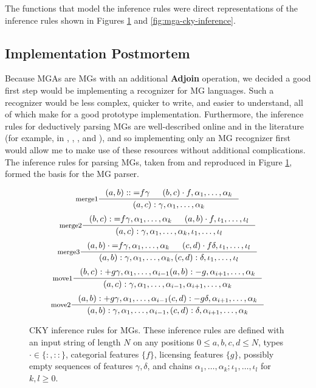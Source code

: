 \documentclass{article}
\begin{document}
The functions that model the inference rules were direct
representations of the inference rules shown in Figures
\ref{fig:mg-cky-inference} and \ref{fig:mga-cky-inference}.


\subsection{Implementation Postmortem}
\label{sec:implementation-postmortem}

Because MGAs are MGs with an additional \textbf{Adjoin} operation, we
decided a good first step would be implementing a recognizer for MG
languages.  Such a recognizer would be less complex, quicker to write,
and easier to understand, all of which make for a good prototype
implementation.  Furthermore, the inference rules for deductively
parsing MGs are well-described online and in the literature (for
example, in \cite{stabler2001}, \cite{harkema2001}, \cite{dost2011},
and \cite{sportiche2013}), and so implementing only an MG recognizer
first would allow me to make use of these resources without additional
complications.  The inference rules for parsing MGs, taken from
\cite{stabler2001} and reproduced in Figure
\ref{fig:mg-cky-inference}, formed the basis for the MG parser.

\begin{figure}[h]
  \centering
  \[
    \inference[merge1]{
      (a, b) :: \text{=}f \gamma &
      (b, c) \cdot f, \alpha_1, \dots, \alpha_k
    }{
      (a, c) : \gamma, \alpha_1, \dots, \alpha_k
    }
  \]
  \[
    \inference[merge2]{
      (b, c) : \text{=}f \gamma, \alpha_1, \dots, \alpha_k &
      (a, b) \cdot f, \iota_1, \dots, \iota_l
    }{
      (a, c) : \gamma, \alpha_1, \dots, \alpha_k, \iota_1, \dots, \iota_l
    }
  \]
  \[
    \inference[merge3]{
      (a, b) \cdot \text{=}f \gamma, \alpha_1, \dots, \alpha_k &
      (c, d) \cdot f \delta, \iota_1, \dots, \iota_l
    }{
      (a, b) : \gamma, \alpha_1, \dots, \alpha_k, (c, d) : \delta, \iota_1, \dots, \iota_l
    }
  \]
  \[
    \inference[move1]{
      (b, c) : +g \gamma, \alpha_1, \dots, \alpha_{i-1}
      (a, b) : -g, \alpha_{i+1}, \dots, \alpha_k
    }{
      (a, c) : \gamma, \alpha_1, \dots, \alpha_{i-1}, \alpha_{i+1}, \dots, \alpha_k
    }
  \]
  \[
    \inference[move2]{
      (a, b) : +g \gamma, \alpha_1, \dots, \alpha_{i-1}
      (c, d) : -g \delta, \alpha_{i+1}, \dots, \alpha_k
    }{
      (a, b) : \gamma, \alpha_1, \dots, \alpha_{i-1}, (c, d) : \delta, \alpha_{i+1}, \dots, \alpha_k
    }
  \]
  \caption{CKY inference rules for MGs.  These inference rules are
    defined with an input string of length $N$ on any positions
    $0 \leq a,b,c,d \leq N$, types $\cdot \in \{ :, :: \}$, categorial
    features $\{f\}$, licensing features $\{g\}$, possibly empty
    sequences of features $\gamma, \delta$, and chains
    $\alpha_1, \dots, \alpha_k; \iota_1,\dots,\iota_l$ for
    $k, l \geq 0$.}
  \label{fig:mg-cky-inference}
\end{figure}
\end{document}

